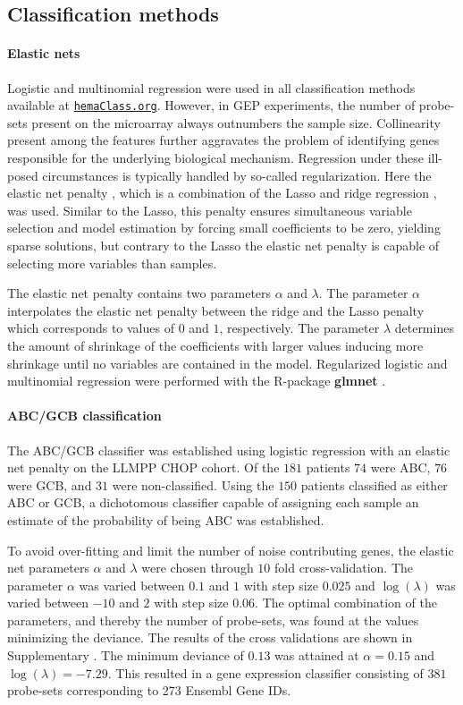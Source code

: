 \documentclass[10pt,letterpaper]{article}
\newcommand{\hemaClass}{\href{http://hemaClass.org}{\texttt{hemaClass.org}}}
\newcommand{\R}{\textsf{R}}
\newcommand{\pkg}[1]{\textbf{#1}}
\begin{document}
\subsection*{Classification methods}

\paragraph{Elastic nets}
Logistic and multinomial regression were used in all classification methods available at \hemaClass{}.
However, in GEP experiments, the number of probe-sets present on the microarray always outnumbers the sample size.
Collinearity present among the features further aggravates the problem of identifying genes responsible for the underlying biological mechanism.
Regression under these ill-posed circumstances is typically handled by so-called regularization.
Here the elastic net penalty \cite{Friedman2010, Zou2005}, which is a combination of the Lasso \cite{Tibshirani1996} and ridge regression \cite{Hoerl1970}, was used.
Similar to the Lasso, this penalty ensures simultaneous variable selection and model estimation by forcing small coefficients to be zero, yielding sparse solutions,
but contrary to the Lasso the elastic net penalty is capable of selecting more variables than samples.

The elastic net penalty contains two parameters $\alpha$ and $\lambda$.
The parameter $\alpha$ interpolates the elastic net penalty between the ridge and the Lasso penalty which corresponds to values of $0$ and $1$, respectively.
The parameter $\lambda$ determines the amount of shrinkage of the coefficients with larger values inducing more shrinkage until no variables are contained in the model.
Regularized logistic and multinomial regression were performed with the \R{}-package \pkg{glmnet} \cite{Friedman2010}.

\paragraph{ABC/GCB classification}
The ABC/GCB classifier was established using logistic regression with an elastic net penalty on the LLMPP CHOP cohort.
Of the $181$ patients $74$ were ABC, $76$ were GCB, and $31$ were non-classified.
Using the $150$ patients classified as either ABC or GCB, a dichotomous classifier capable of assigning each sample an estimate of the probability of being ABC was established.

To avoid over-fitting and limit the number of noise contributing genes, the elastic net parameters $\alpha$ and $\lambda$ were chosen through $10$ fold cross-validation.
The parameter $\alpha$ was varied between $0.1$ and $1$ with step size $0.025$ and $\log(\lambda)$ was varied between $-10$ and $2$ with step size $0.06$.
The optimal combination of the parameters, and thereby the number of probe-sets, was found at the values minimizing the deviance.
The results of the cross validations are shown in Supplementary .
The minimum deviance of $0.13$ was attained at $\alpha = 0.15$ and $\log(\lambda) = -7.29$. This resulted in a gene expression classifier consisting of $381$ probe-sets corresponding to 273 Ensembl Gene IDs.
\end{document}
